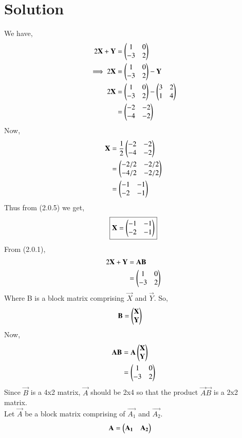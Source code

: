 \documentclass[journal,12pt,twocolumn]{IEEEtran}
\begin{document}
\section{Solution}
We have, 
\begin{align}
2\mathbf{X}+\mathbf{Y} &= \begin{pmatrix}1 & 0 \\ -3 & 2 \end{pmatrix} \\
\implies 2\mathbf{X} &= \begin{pmatrix}1 & 0 \\ -3 & 2 \end{pmatrix} - \mathbf{Y} \\
2\mathbf{X} &= \begin{pmatrix}1 & 0 \\ -3 & 2 \end{pmatrix} - \begin{pmatrix}3 & 2 \\ 1 & 4\end{pmatrix} \notag \\
&= \begin{pmatrix}-2 & -2 \\ -4 & -2 \end{pmatrix}
\end{align}
Now, 
\begin{align}
\mathbf{X} &= \frac{1}{2}\begin{pmatrix}-2 & -2 \\ -4 & -2 \end{pmatrix} \\
&= \begin{pmatrix}-2/2 & -2/2 \\ -4/2 & -2/2 \end{pmatrix}\notag \\
&= \begin{pmatrix}-1 & -1 \\ -2 & -1\end{pmatrix}
\end{align}
Thus from (2.0.5) we get, 
\begin{align*}
    \boxed{ \mathbf{X} = \begin{pmatrix}-1 & -1 \\ -2 & -1\end{pmatrix} }
\end{align*}
From (2.0.1), 
\begin{align}
    2\mathbf{X}+\mathbf{Y} &=\mathbf{A}\mathbf{B} \\
    &= \begin{pmatrix}1 & 0 \\ -3 & 2\end{pmatrix}
\end{align}
Where B is a block matrix comprising $\vec{X}$ and $\vec{Y}$. So, 
\begin{align}
    \mathbf{B} &= \begin{pmatrix}\mathbf{X} \\ \mathbf{Y}\end{pmatrix}
\end{align}
Now, 
\begin{align}
    \mathbf{A}\mathbf{B} &= \mathbf{A}\begin{pmatrix}\mathbf{X} \\ \mathbf{Y}\end{pmatrix} \notag\\
    &= \begin{pmatrix}1 & 0 \\ -3 & 2\end{pmatrix} 
\end{align}
Since $\vec{B}$ is a 4x2 matrix, $\vec{A}$ should be 2x4 so that the product $\vec{A}\vec{B}$ is a 2x2 matrix.\\ 
Let $\vec{A}$ be a block matrix comprising of $\vec{A_{1}}$ and
$\vec{A_{2}}$. 
\begin{align}
    \mathbf{A} &= \begin{pmatrix}\mathbf{A_{1}}& \mathbf{A_{2}}\end{pmatrix}
\end{align}
\end{document}
